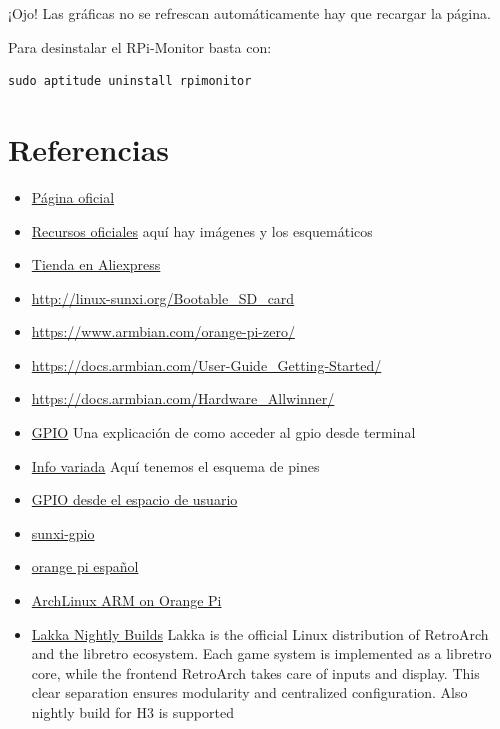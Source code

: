 \documentclass[12pt,spanish,]{scrartcl}
\providecommand{\tightlist}{%
  \setlength{\itemsep}{0pt}\setlength{\parskip}{0pt}}
\begin{document}
¡Ojo! Las gráficas no se refrescan automáticamente hay que recargar la
página.

Para desinstalar el RPi-Monitor basta con:

\begin{verbatim}
sudo aptitude uninstall rpimonitor
\end{verbatim}

\section{Referencias}\label{referencias-1}

\begin{itemize}
\tightlist
\item
  \href{http://www.orangepi.org/}{Página oficial}
\item
  \href{http://www.orangepi.org/downloadresources/}{Recursos oficiales}
  aquí hay imágenes y los esquemáticos
\item
  \href{https://www.aliexpress.com/store/1553371?spm=2114.8147860.0.0.F1q43C}{Tienda
  en Aliexpress}
\item
  \url{http://linux-sunxi.org/Bootable_SD_card}
\item
  \url{https://www.armbian.com/orange-pi-zero/}
\item
  \url{https://docs.armbian.com/User-Guide_Getting-Started/}
\item
  \url{https://docs.armbian.com/Hardware_Allwinner/}
\item
  \href{https://linux-sunxi.org/GPIO}{GPIO} Una explicación de como
  acceder al gpio desde terminal
\item
  \href{https://linux-sunxi.org/Orange_Pi_Zero}{Info variada} Aquí
  tenemos el esquema de pines
\item
  \href{https://forum.armbian.com/index.php/topic/1886-gpio-access-from-user-space/}{GPIO
  desde el espacio de usuario}
\item
  \href{https://forum.armbian.com/index.php/topic/1471-solved-difficulty-accessing-gpio-via-the-sunxi-gpio-export-interface/}{sunxi-gpio}
\item
  \href{http://orangepiweb.es/index.php}{orange pi español}
\item
  \href{https://www.amedeobaragiola.me/blog/2016/06/04/archlinux-arm-on-orange-pi-one/}{ArchLinux
  ARM on Orange Pi}
\item
  \href{http://mirror.lakka.tv/nightly/}{Lakka Nightly Builds} Lakka is
  the official Linux distribution of RetroArch and the libretro
  ecosystem. Each game system is implemented as a libretro core, while
  the frontend RetroArch takes care of inputs and display. This clear
  separation ensures modularity and centralized configuration. Also
  nightly build for H3 is supported
\end{itemize}
\end{document}
